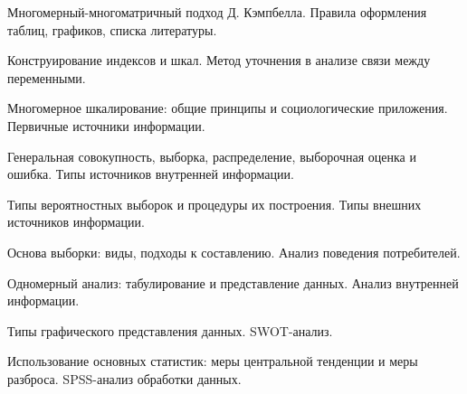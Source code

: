 \documentclass[
	14pt,
	a4paper,
	]
	{scrartcl}
\begin{document}
\newpage


\shapk
{}
\setcounter{zad}{0}

\vfill
\z Многомерный-многоматричный подход Д. Кэмпбелла.
 \vfill
\z Правила оформления таблиц, графиков, списка литературы.
 \vfill

\vfill

\newpage


\shapk
{}
\setcounter{zad}{0}

\vfill
\z Конструирование индексов и шкал.
 \vfill
\z Метод уточнения в анализе связи между переменными.
 \vfill

\vfill

\newpage


\shapk
{}
\setcounter{zad}{0}

\vfill
\z Многомерное шкалирование: общие принципы и социологические приложения.
 \vfill
\z Первичные источники информации.
 \vfill

\vfill

\newpage


\shapk
{}
\setcounter{zad}{0}

\vfill
\z Генеральная совокупность, выборка, распределение, выборочная оценка и ошибка.
 \vfill
\z Типы источников внутренней информации.
 \vfill

\vfill

\newpage


\shapk
{}
\setcounter{zad}{0}

\vfill
\z Типы вероятностных выборок и процедуры их построения.
 \vfill
\z Типы внешних источников информации.
 \vfill

\vfill

\newpage


\shapk
{}
\setcounter{zad}{0}

\vfill
\z Основа выборки: виды, подходы к составлению.
 \vfill
\z Анализ поведения потребителей.
 \vfill

\vfill

\newpage


\shapk
{}
\setcounter{zad}{0}

\vfill
\z Одномерный анализ: табулирование и представление данных.
 \vfill
\z Анализ внутренней информации.
 \vfill

\vfill

\newpage


\shapk
{}
\setcounter{zad}{0}

\vfill
\z Типы графического представления данных.
 \vfill
\z SWOT-анализ.
 \vfill

\vfill

\newpage


\shapk
{}
\setcounter{zad}{0}

\vfill
\z Использование основных статистик: меры центральной тенденции и меры разброса.
 \vfill
\z SPSS-анализ обработки данных.
 \vfill

\vfill

\newpage
\end{document}
